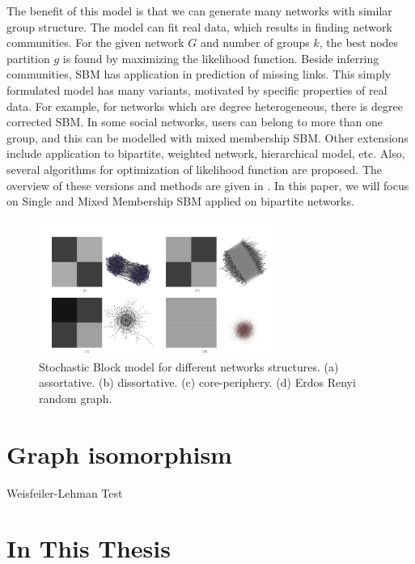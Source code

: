 The benefit of this model is that we can generate many networks with similar group structure. The model can fit real data, which results in finding network communities. For the given network $G$ and number of groups $k$, the best nodes partition $g$ is found by maximizing the likelihood function. Beside inferring communities, SBM has application in prediction of missing links. This simply formulated model has many variants, motivated by specific properties of real data. For example, for networks which are degree heterogeneous, there is degree corrected SBM. In some social networks, users can belong to more than one group, and this can be modelled with mixed membership SBM. Other extensions include application to bipartite, weighted network, hierarchical model, etc. Also, several algorithms for optimization of likelihood function are proposed. The overview of these versions and methods are given in \cite{comparison}. In this paper, we will focus on Single and Mixed Membership SBM applied on bipartite networks.  
\begin{figure}
	\centering
	\includegraphics[width=0.7\textwidth]{Figures/structures.png}
	\caption{Stochastic Block model for different networks structures. (a) assortative. (b) dissortative. (c) core-periphery. (d) Erdos Renyi random graph.}
	\label{fig:SBM}
\end{figure}

\section{Graph isomorphism}


Weisfeiler-Lehman Test

\section{In This Thesis}


